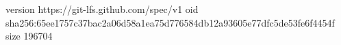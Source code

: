 version https://git-lfs.github.com/spec/v1
oid sha256:65ee1757c37bac2a06d58a1ea75d776584db12a93605e77dfc5de53fe6f4454f
size 196704
